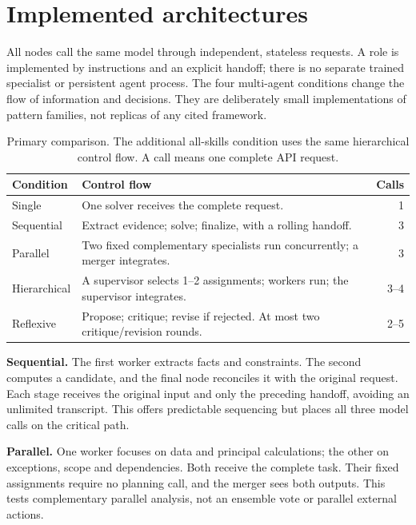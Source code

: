 \section{Implemented architectures}
All nodes call the same model through independent, stateless requests. A role is implemented by instructions and an explicit handoff; there is no separate trained specialist or persistent agent process. The four multi-agent conditions change the flow of information and decisions. They are deliberately small implementations of pattern families, not replicas of any cited framework.

\begin{table}[htbp]
\centering\small
\begin{tabular}{@{}p{26mm}p{91mm}r@{}}
\toprule
\textbf{Condition} & \textbf{Control flow} & \textbf{Calls}\\
\midrule
Single & One solver receives the complete request. & 1\\
Sequential & Extract evidence; solve; finalize, with a rolling handoff. & 3\\
Parallel & Two fixed complementary specialists run concurrently; a merger integrates. & 3\\
Hierarchical & A supervisor selects 1--2 assignments; workers run; the supervisor integrates. & 3--4\\
Reflexive & Propose; critique; revise if rejected. At most two critique/revision rounds. & 2--5\\
\bottomrule
\end{tabular}
\caption{Primary comparison. The additional all-skills condition uses the same hierarchical control flow. A call means one complete API request.}
\label{tab:architectures}
\end{table}

\textbf{Sequential.} The first worker extracts facts and constraints. The second computes a candidate, and the final node reconciles it with the original request. Each stage receives the original input and only the preceding handoff, avoiding an unlimited transcript. This offers predictable sequencing but places all three model calls on the critical path.

\textbf{Parallel.} One worker focuses on data and principal calculations; the other on exceptions, scope and dependencies. Both receive the complete task. Their fixed assignments require no planning call, and the merger sees both outputs. This tests complementary parallel analysis, not an ensemble vote or parallel external actions.

